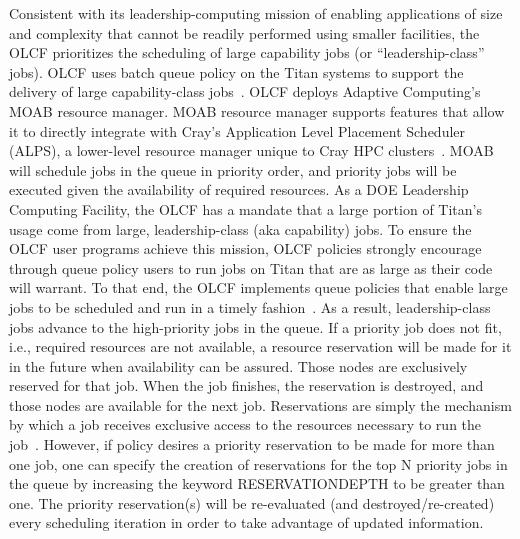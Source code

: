 Consistent with its leadership-computing mission of enabling applications of
size and complexity that cannot be readily performed using smaller facilities,
the OLCF prioritizes the scheduling of large capability jobs (or
``leadership-class'' jobs). OLCF uses batch queue policy on the Titan systems
to support the delivery of large capability-class jobs~\cite{titan_sched}.  
OLCF deploys Adaptive Computing's MOAB resource manager. 
MOAB resource manager supports features that allow it to directly integrate with
Cray's Application Level Placement Scheduler (ALPS), a lower-level resource
manager unique to Cray HPC clusters~\cite{osti_1086656}. 
MOAB will schedule jobs in the queue in priority order, and priority jobs will
be executed given the availability of required resources.  As a DOE Leadership
Computing Facility, the OLCF has a mandate that a large portion of Titan's
usage come from large, leadership-class (aka capability) jobs. To ensure the
OLCF user programs achieve this mission, OLCF policies strongly encourage
through queue policy users to run jobs on Titan that are as large as their
code will warrant. To that end, the OLCF implements queue policies that enable
large jobs to be scheduled and run in a timely fashion~\cite{titan_sched}. 
As a result, leadership-class jobs advance to the high-priority jobs in the
queue.
If a priority job does not fit, i.e., required resources are not available, a
resource reservation will be made for it in the future when availability can be
assured. Those nodes are exclusively reserved for that job. When the job
finishes, the reservation is destroyed, and those nodes are available for the
next job. Reservations are simply the mechanism by which a job receives
exclusive access to the resources necessary to run the job~\cite{osti_1086656}. 
However, if policy desires a priority reservation to be made
for more than one job, one can specify the creation of reservations for the top
N priority jobs in the queue by increasing the keyword RESERVATIONDEPTH to be
greater than one.  The priority reservation(s) will be re-evaluated (and
destroyed/re-created) every scheduling iteration in order to take advantage of
updated information.

